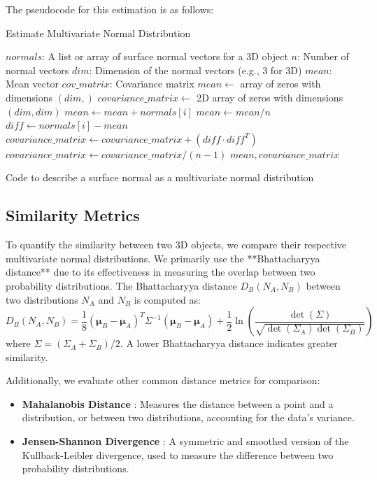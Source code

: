 \documentclass{article}
\begin{document}
The pseudocode for this estimation is as follows:
\begin{algorithm}[H]
\caption{Estimate Multivariate Normal Distribution}
\label{algorithm:estimate-mvn}
\begin{algorithmic}[1]
\Require
  \Statex $normals$: A list or array of surface normal vectors for a 3D object
  \Statex $n$: Number of normal vectors
  \Statex $dim$: Dimension of the normal vectors (e.g., 3 for 3D)
\Ensure
  \Statex $mean$: Mean vector
  \Statex $cov\_matrix$: Covariance matrix
  \State $mean \gets$ array of zeros with dimensions $(dim,)$
  \State $covariance\_matrix \gets$ 2D array of zeros with dimensions $(dim, dim)$
    \State $mean \gets mean + normals[i]$
  \EndFor
  \State $mean \gets mean / n$
    \State $diff \gets normals[i] - mean$
    \State $covariance\_matrix \gets covariance\_matrix + (diff \cdot diff^T)$
  \EndFor
  \State $covariance\_matrix \gets covariance\_matrix / (n - 1)$
  \State \Return $mean, covariance\_matrix$
\EndFunction
\end{algorithmic}
\caption{Code to describe a surface normal as a multivariate normal distribution}
\end{algorithm}



\subsection{Similarity Metrics}
To quantify the similarity between two 3D objects, we compare their respective multivariate normal distributions. We primarily use the **Bhattacharyya distance** \cite{Bhattacharyya} due to its effectiveness in measuring the overlap between two probability distributions. The Bhattacharyya distance $D_B(N_A, N_B)$ between two distributions $N_A$ and $N_B$ is computed as:
\[
D_B(N_A, N_B) = \frac{1}{8} (\boldsymbol{\mu}_B - \boldsymbol{\mu}_A)^T \Sigma^{-1} (\boldsymbol{\mu}_B - \boldsymbol{\mu}_A) + \frac{1}{2} \ln \left(\frac{\det(\Sigma)}{\sqrt{\det(\Sigma_A) \det(\Sigma_B)}}\right)
\]
where $\Sigma = (\Sigma_A + \Sigma_B) / 2$. A lower Bhattacharyya distance indicates greater similarity.

Additionally, we evaluate other common distance metrics for comparison:
\begin{itemize}
    \item \textbf{Mahalanobis Distance} \cite{Mahalanobis}: Measures the distance between a point and a distribution, or between two distributions, accounting for the data's variance.
    \item \textbf{Jensen-Shannon Divergence} \cite{JensenShannon}: A symmetric and smoothed version of the Kullback-Leibler divergence, used to measure the difference between two probability distributions.
\end{itemize}
\end{document}
